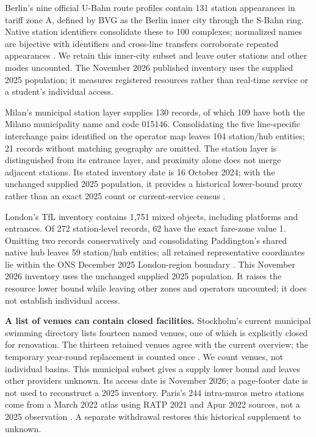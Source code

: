 Berlin's nine official U-Bahn route profiles contain 131 station appearances
in tariff zone A, defined by BVG as the Berlin inner city through the S-Bahn
ring. Native station identifiers consolidate these to 100 complexes; normalized
names are bijective with identifiers and cross-line transfers corroborate
repeated appearances \cite{bvg}. We retain this inner-city subset and leave
outer stations and other modes uncounted. The November 2026 published inventory
uses the supplied 2025 population; it measures registered resources rather
than real-time service or a student's individual access.

Milan's municipal station layer supplies 130 records, of which 109 have both the Milano municipality name and code 015146. Consolidating the five line-specific interchange pairs identified on the operator map leaves 104 station/hub entities; 21 records without matching geography are omitted. The station layer is distinguished from its entrance layer, and proximity alone does not merge adjacent stations. Its stated inventory date is 16 October 2024; with the unchanged supplied 2025 population, it provides a historical lower-bound proxy rather than an exact 2025 count or current-service census \cite{milanmetro}.

London's TfL inventory contains 1,751 mixed objects, including platforms and entrances. Of 272 station-level records, 62 have the exact fare-zone value 1. Omitting two records conservatively and consolidating Paddington's shared native hub leaves 59 station/hub entities; all retained representative coordinates lie within the ONS December 2025 London-region boundary \cite{tflinventory,onslondon}. This November 2026 inventory uses the unchanged supplied 2025 population. It raises the resource lower bound while leaving other zones and operators uncounted; it does not establish individual access.

\textbf{A list of venues can contain closed facilities.}
Stockholm's current municipal swimming directory lists fourteen named venues,
one of which is explicitly closed for renovation. The thirteen retained venues
agree with the current overview; the temporary year-round replacement is
counted once \cite{stockpool}. We count venues, not individual basins. This
municipal subset gives a supply lower bound and leaves other providers unknown.
Its access date is November 2026; a page-footer date is not used to reconstruct
a 2025 inventory. Paris's 244 intra-muros metro stations come from a March 2022
atlas using RATP 2021 and Apur 2022 sources, not a 2025 observation
\cite{apur}. A separate withdrawal restores this historical supplement to unknown.

